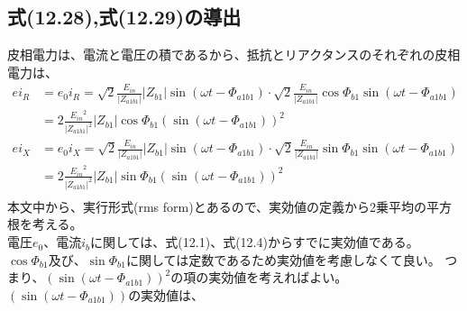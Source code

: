 \documentclass[fleqn,11pt,a4paper,dvipdfmx]{jsarticle}
\numberwithin{equation}{section}
\begin{document}
\subsection*{式(12.28),式(12.29)の導出}
皮相電力は、電流と電圧の積であるから、抵抗とリアクタンスのそれぞれの皮相電力は、
\begin{align*}
  ei_R  &= e_0 i_R = \sqrt{2} \frac{ E_{in} }{\left| Z_{a1b1} \right|} \left|Z_{b1}\right|  \sin \left(\omega t - \Phi_{a1b1}\right) \cdot \sqrt{2} \frac{ E_{in} }{\left| Z_{a1b1} \right|} \cos \Phi_{b1} \sin \left(\omega t - \Phi_{a1b1}\right) \\
        &= 2 \frac{{E_{in}}^2}{{\left|Z_{a1b1}\right|}^2}\left|Z_{b1}\right| \cos \Phi_{b1} {\left(\sin \left( \omega t - \Phi_{a1b1}\right)\right)}^2 \\
  ei_X  &= e_0 i_X = \sqrt{2} \frac{ E_{in} }{\left| Z_{a1b1} \right|} \left|Z_{b1}\right| \sin \left(\omega t - \Phi_{a1b1}\right) \cdot \sqrt{2} \frac{ E_{in} }{\left| Z_{a1b1} \right|} \sin \Phi_{b1} \sin \left(\omega t - \Phi_{a1b1}\right) \\
        &= 2 \frac{{E_{in}}^2}{{\left|Z_{a1b1}\right|}^2} \left|Z_{b1}\right| \sin \Phi_{b1} {\left(\sin \left( \omega t - \Phi_{a1b1}\right)\right)}^2 \\
\end{align*}
本文中から、実行形式(rms form)とあるので、実効値の定義から2乗平均の平方根を考える。\\
電圧$e_0$、電流$i_b$に関しては、式(12.1)、式(12.4)からすでに実効値である。
$\cos \Phi_{b1}$及び、$\sin \Phi_{b1}$に関しては定数であるため実効値を考慮しなくて良い。
つまり、${\left(\sin \left( \omega t - \Phi_{a1b1}\right)\right)}^2$の項の実効値を考えればよい。
$\left(\sin \left( \omega t - \Phi_{a1b1}\right)\right)$の実効値は、
\end{document}
